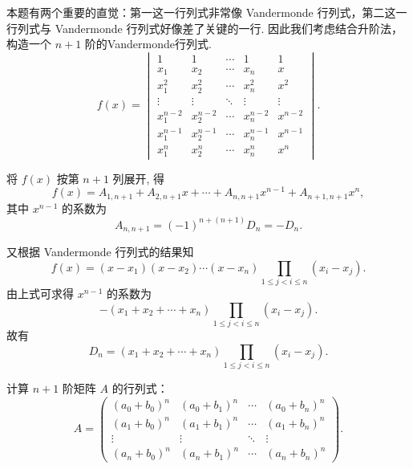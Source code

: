 \begin{solution}
    本题有两个重要的直觉：第一这一行列式非常像 Vandermonde 行列式，第二这一行列式与 Vandermonde 行列式好像差了关键的一行. 因此我们考虑结合升阶法，构造一个 $n+1$ 阶的Vandermonde行列式.
    \[ f(x)=\begin{vmatrix}
            1         & 1         & \cdots & 1         & 1       \\
            x_1       & x_2       & \cdots & x_n       & x       \\
            x_1^{2}   & x_2^{2}   & \cdots & x_n^{2}   & x^{2}   \\
            \vdots    & \vdots    & \ddots & \vdots    & \vdots  \\
            x_1^{n-2} & x_2^{n-2} & \cdots & x_n^{n-2} & x^{n-2} \\
            x_1^{n-1} & x_2^{n-1} & \cdots & x_n^{n-1} & x^{n-1} \\
            x_1^{n}   & x_2^{n}   & \cdots & x_n^{n}   & x^{n}
        \end{vmatrix}. \]

    将 $f(x)$ 按第 $n+1$ 列展开, 得
    \[ f(x)=A_{1, n+1}+A_{2, n+1} x+\cdots+A_{n, n+1} x^{n-1}+A_{n+1, n+1} x^{n}, \]
    其中 $x^{n-1}$ 的系数为
    \[ A_{n, n+1}=(-1)^{n+(n+1)} D_n=-D_n. \]

    又根据 Vandermonde 行列式的结果知
    \[ f(x)=(x-x_1)(x-x_2)\cdots(x-x_n) \prod_{1 \leqslant j<i \leqslant n}(x_i-x_j). \]
    由上式可求得 $x^{n-1}$ 的系数为
    \[ -(x_1+x_2+\cdots+x_n) \prod_{1 \leqslant j<i \leqslant n}(x_i-x_j). \]
    故有
    \[ D_n=(x_1+x_2+\cdots+x_n) \prod_{1 \leqslant j<i \leqslant n}(x_i-x_j). \]
\end{solution}

\begin{example}{}{}
    计算 $n + 1$ 阶矩阵 $A$ 的行列式：
    \[ A = \begin{pmatrix}
        (a_0 + b_0)^n & (a_0 + b_1)^n & \cdots & (a_0 + b_n)^n \\
        (a_1 + b_0)^n & (a_1 + b_1)^n & \cdots & (a_1 + b_n)^n \\
        \vdots        & \vdots        & \ddots & \vdots        \\
        (a_n + b_0)^n & (a_n + b_1)^n & \cdots & (a_n + b_n)^n
    \end{pmatrix}. \]
\end{example}

